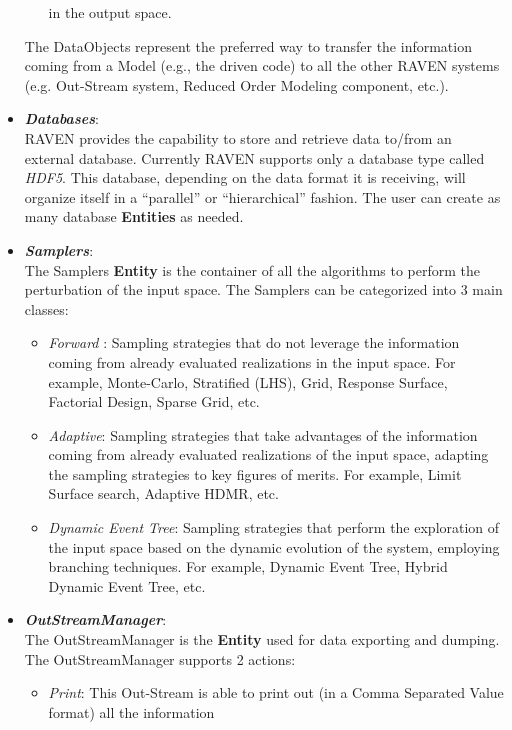 \begin{itemize}
\begin{itemize}
                                               in the output space.
     \end{itemize}
     The DataObjects represent the preferred way to transfer the information coming from a Model (e.g., the driven code) to
      all the other RAVEN systems (e.g. Out-Stream system, Reduced Order Modeling component, etc.). 
  \item \textit{\textbf{Databases}}:
      \\ RAVEN provides the capability to store and retrieve data to/from an external database. Currently RAVEN supports
       only a database type called \textit{HDF5}. This database, depending on the data format it is receiving, will 
       organize itself in a ``parallel'' or ``hierarchical'' fashion. The user can create as many database \textbf{Entities} as needed. 
  \item \textit{\textbf{Samplers}}:
  \\ The Samplers  \textbf{Entity} is the container of all the algorithms to perform the perturbation of the input space.
      The Samplers can be categorized into 3 main classes:
      \begin{itemize}
        \item  \textit{Forward} : Sampling strategies that do not leverage the information coming from already evaluated 
        realizations in the input space. For example, Monte-Carlo, Stratified (LHS), Grid, Response Surface, Factorial Design, 
        Sparse Grid, etc.
        \item  \textit{Adaptive}:  Sampling strategies that take advantages of the information coming from already evaluated 
        realizations of the input space, adapting the sampling strategies to key figures of merits. For example, Limit Surface 
        search, Adaptive HDMR, etc.
        \item \textit{Dynamic Event Tree}: Sampling strategies that perform the exploration of the input space based on the 
        dynamic evolution of the system, employing branching techniques. For example, Dynamic Event Tree, Hybrid 
        Dynamic Event Tree, etc.
      \end{itemize}
  \item \textit{\textbf{OutStreamManager}}:
  \\ The OutStreamManager is the \textbf{Entity} used  for data exporting and dumping. The OutStreamManager supports
   2 actions:
      \begin{itemize}
       \item \textit{Print}: This Out-Stream is able to print out (in a Comma Separated Value format) all the information 

\end{itemize}
\end{itemize}
